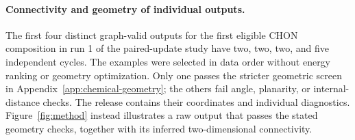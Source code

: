 \paragraph{Connectivity and geometry of individual outputs.}
The first four distinct graph-valid outputs for the first eligible CHON composition in run 1 of the paired-update study have two, two, two, and five independent cycles. The examples were selected in data order without energy ranking or geometry optimization. Only one passes the stricter geometric screen in Appendix~\ref{app:chemical-geometry}; the others fail angle, planarity, or internal-distance checks. The release contains their coordinates and individual diagnostics. Figure~\ref{fig:method} instead illustrates a raw output that passes the stated geometry checks, together with its inferred two-dimensional connectivity.
